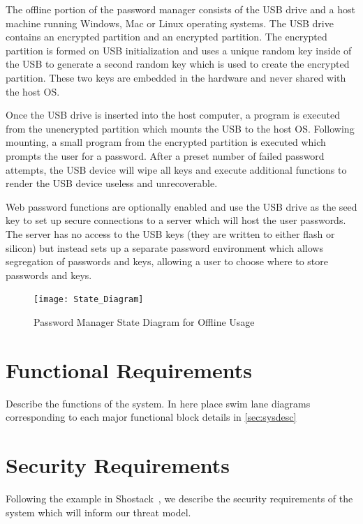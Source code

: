 \documentclass{tufte-book}
\newcommand{\pat}[1]{{\textcolor{red}{Pat: #1}}}
\begin{document}
The offline portion of the password manager consists of the USB drive and a host machine running Windows, Mac or Linux operating systems. The USB drive contains an encrypted partition and an encrypted partition.  The encrypted partition is formed on USB initialization and uses a unique random key inside of the USB to generate a second random key which is used to create the encrypted partition. These two keys are embedded in the hardware and never shared with the host OS.
\par Once the USB drive is inserted into the host computer, a program is executed from the unencrypted partition which mounts the USB to the host OS.  Following mounting, a small program from the encrypted partition is executed which prompts the user for a password. After a preset number of failed password attempts, the USB device will wipe all keys and execute additional functions to render the USB device useless and unrecoverable.\sidenote{\pat{the sidenote command can be used to highlight a finding or concept}}
\par Web password functions are optionally enabled and use the USB drive as the seed key to set up secure connections to a server which will host the user passwords.  The server has no access to the USB keys (they are written to either flash or silicon) but instead sets up a separate password environment which allows segregation of passwords and keys, allowing a user to choose where to store passwords and keys. 

\begin{figure}[h]
    \centering
    \texttt{[image: State\_Diagram]}
    \caption{Password Manager State Diagram for Offline Usage}
    \label{fig:state_diagram}
\end{figure}

\section{Functional Requirements}
\label{sec:funcreq}
Describe the functions of the system.  In here place swim lane diagrams corresponding to each major functional block details in \ref{sec:sysdesc}

\section{Security Requirements}
\label{sec:secreqs}
Following the example in Shostack~\cite{shostackbook}, we describe the security requirements of the system which will inform our threat model.
\end{document}
